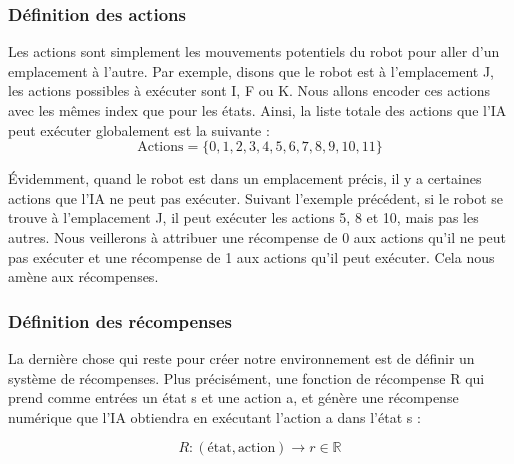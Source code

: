 \documentclass{article}
\begin{document}
\subsubsection{Définition des actions}
Les actions sont simplement les mouvements potentiels du robot pour aller d'un emplacement à l'autre. Par exemple, disons que le robot est à l'emplacement J, les actions possibles à exécuter sont I, F ou K. Nous allons encoder ces actions avec les mêmes index que pour les états. Ainsi, la liste totale des actions que l'IA peut exécuter globalement est la suivante :
\[ \text{Actions} = \{0,1,2,3,4,5,6,7,8,9,10,11\} \]

Évidemment, quand le robot est dans un emplacement précis, il y a certaines actions que l'IA ne peut pas exécuter. Suivant l'exemple précédent, si le robot se trouve à l'emplacement J, il peut exécuter les actions 5, 8 et 10, mais pas les autres. Nous veillerons à attribuer une récompense de 0 aux actions qu'il ne peut pas exécuter et une récompense de 1 aux actions qu'il peut exécuter. Cela nous amène aux récompenses.

\subsubsection{Définition des récompenses}
La dernière chose qui reste pour créer notre environnement est de définir un système de récompenses.  Plus précisément, une fonction de récompense R qui prend comme entrées un état s et une action a, et génère une récompense numérique que l'IA obtiendra en exécutant l'action a dans l'état s :

\[ R: (\text{état}, \text{action}) \rightarrow r \in \mathbb{R} \]
\end{document}
